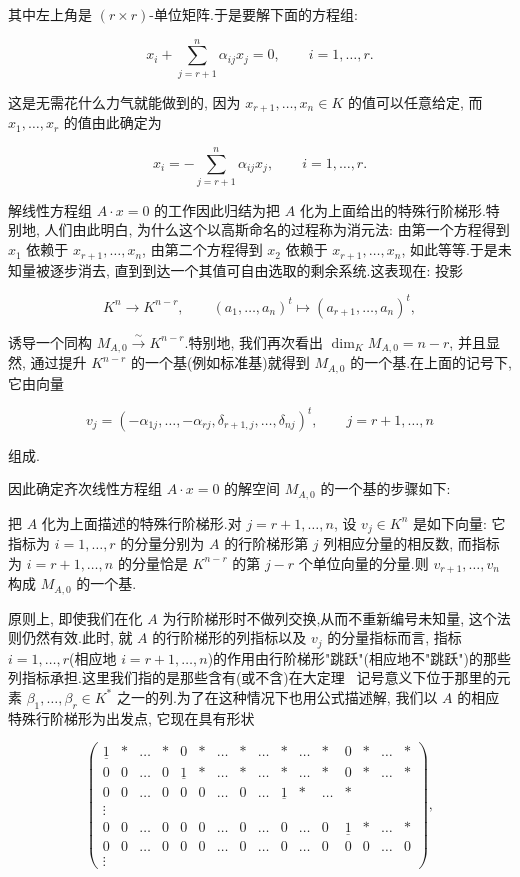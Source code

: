 其中左上角是 $(r \times r)$-单位矩阵.于是要解下面的方程组:

\[
x_i + \sum_{j = r + 1}^{n}\alpha_{ij}x_j = 0, \qquad i = 1, \ldots, r\text{.}
\]

这是无需花什么力气就能做到的, 因为 $x_{r + 1}, \ldots, x_n \in K$ 的值可以任意给定, 而 $x_1, \ldots, x_r$ 的值由此确定为

\[
x_i = -\sum_{j = r + 1}^{n}\alpha_{ij}x_j, \qquad i = 1, \ldots, r\text{.}
\]

解线性方程组 $A \cdot x = 0$ 的工作因此归结为把 $A$ 化为上面给出的特殊行阶梯形.特别地, 人们由此明白, 为什么这个以高斯命名的过程称为消元法: 由第一个方程得到 $x_1$ 依赖于 $x_{r + 1}, \ldots, x_n$, 由第二个方程得到 $x_2$ 依赖于 $x_{r + 1}, \ldots, x_n$, 如此等等.于是未知量被逐步消去, 直到到达一个其值可自由选取的剩余系统.这表现在: 投影

\[
K^n \longrightarrow K^{n - r}, \qquad (a_1, \ldots, a_n)^t \longmapsto (a_{r + 1}, \ldots, a_n)^t,
\]

诱导一个同构 $M_{A, 0} \xrightarrow{\sim} K^{n - r}$.特别地, 我们再次看出 $\dim_K M_{A, 0} = n - r$, 并且显然, 通过提升 $K^{n - r}$ 的一个基(例如标准基)就得到 $M_{A, 0}$ 的一个基.在上面的记号下, 它由向量

\[
v_j = (-\alpha_{1j}, \ldots, -\alpha_{rj}, \delta_{r + 1, j}, \ldots, \delta_{nj})^t, \qquad j = r + 1, \ldots, n
\]

组成.

因此确定齐次线性方程组 $A \cdot x = 0$ 的解空间 $M_{A, 0}$ 的一个基的步骤如下:

把 $A$ 化为上面描述的特殊行阶梯形.对 $j = r + 1, \ldots, n$, 设 $v_j \in K^n$ 是如下向量: 它指标为 $i = 1, \ldots, r$ 的分量分别为 $A$ 的行阶梯形第 $j$ 列相应分量的相反数, 而指标为 $i = r + 1, \ldots, n$ 的分量恰是 $K^{n - r}$ 的第 $j - r$ 个单位向量的分量.则 $v_{r + 1}, \ldots, v_n$ 构成 $M_{A, 0}$ 的一个基.

原则上, 即使我们在化 $A$ 为行阶梯形时不做列交换,从而不重新编号未知量, 这个法则仍然有效.此时, 就 $A$ 的行阶梯形的列指标以及 $v_j$ 的分量指标而言, 指标 $i = 1, \ldots, r$(相应地 $i = r + 1, \ldots, n$)的作用由行阶梯形"跳跃"(相应地不"跳跃")的那些列指标承担.这里我们指的是那些含有(或不含)在大定理~ 记号意义下位于那里的元素 $\beta_1, \ldots, \beta_r \in K^*$ 之一的列.为了在这种情况下也用公式描述解, 我们以 $A$ 的相应特殊行阶梯形为出发点, 它现在具有形状

\[
\begin{pmatrix}
\underline{1} & * & \ldots & * & 0 & * & \ldots & * & \ldots & * & \ldots & * & 0 & * & \ldots & * \\
0 & 0 & \ldots & 0 & \underline{1} & * & \ldots & * & \ldots & * & \ldots & * & 0 & * & \ldots & * \\
0 & 0 & \ldots & 0 & 0 & 0 & \ldots & 0 & \ldots & \underline{1} & * & \ldots & * \\
\vdots \\
0 & 0 & \ldots & 0 & 0 & 0 & \ldots & 0 & \ldots & 0 & \ldots & 0 & \underline{1} & * & \ldots & * \\
0 & 0 & \ldots & 0 & 0 & 0 & \ldots & 0 & \ldots & 0 & \ldots & 0 & 0 & 0 & \ldots & 0 \\
\vdots
\end{pmatrix},
\]

